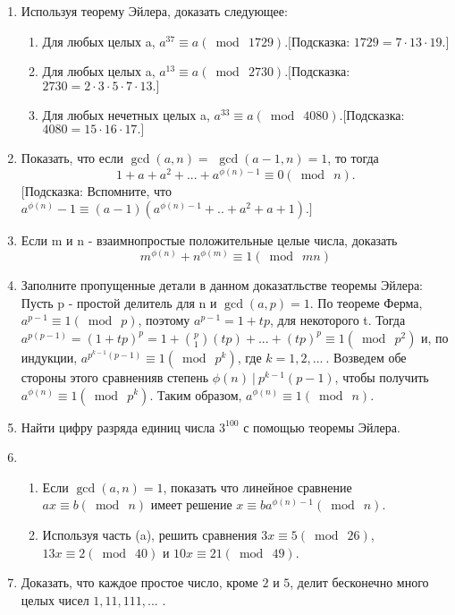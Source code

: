 \documentclass[11pt, leqno]{article}
\begin{document}
\begin{enumerate}
	\item Используя теорему Эйлера, доказать следующее:
		\begin{enumerate}
			\item Для любых целых a, $a^{37} \equiv a (\bmod\ 1729). [$Подсказка: $1729 = 7 \cdot 13 \cdot 19.]$
			\item Для любых целых a, $a^{13} \equiv a (\bmod\ 2730). [$Подсказка: $2730 = 2 \cdot 3 \cdot 5 \cdot 7 \cdot 13.]$
			\item Для любых нечетных целых a, $a^{33} \equiv a (\bmod\ 4080). [$Подсказка: $4080 = 15 \cdot 16 \cdot 17.]$
		\end{enumerate}
	\item Показать, что если $\gcd(a, n) =$ $\gcd(a-1, n) = 1$, то тогда
	\[1 + a + a^2 + ... + a^{\phi(n)-1}  \equiv 0 (\bmod\ n).\]
	$[$Подсказка: Вспомните, что $a^{\phi(n)} - 1 \equiv (a - 1)(a^{\phi(n) - 1} + .. + a^2 + a + 1). ]$
	\item Если m и n - взаимнопростые положительные целые числа, доказать
	\[m^{\phi(n)} + n^{\phi(m)} \equiv 1 (\bmod\ mn)\]
	\item Заполните пропущенные детали в данном доказатльстве теоремы Эйлера: Пусть p - простой делитель для n и $\gcd(a, p) = 1$. По теореме Ферма, $a^{p - 1} \equiv 1 (\bmod\ p)$, поэтому $a^{p - 1} = 1 + tp$, для некоторого t. Тогда $a^{p(p - 1)} = (1 + tp)^p = 1 + \binom{p}{1} (tp) + ... + (tp)^p \equiv 1 (\bmod\ p^2)$ и, по индукции, $a^{p^{k - 1}(p - 1)} \equiv 1 (\bmod\ p^k)$, где $k = 1, 2, ...\ .$ Возведем обе стороны этого сравненияв степень $\phi(n)\ |\ p^{k - 1}(p - 1)$, чтобы получить $a^{\phi(n)} \equiv 1 (\bmod\ p^k)$. Таким образом, $a^{\phi(n)} \equiv 1 (\bmod\ n)$.
	\item Найти цифру разряда единиц числа $3^{100}$ с помощью теоремы Эйлера.
	\item 	\begin{enumerate}
			\item Если $\gcd(a, n) = 1$, показать что линейное сравнение $ax \equiv b (\bmod\ n)$ имеет решение $x \equiv  ba^{\phi(n) - 1} (\bmod\ n)$.
			\item Используя часть (a), решить сравнения $3x \equiv 5 (\bmod\ 26)$, $13x \equiv 2 (\bmod\ 40)$ и $10x \equiv 21 (\bmod\ 49)$.
			\end{enumerate}
	\item Доказать, что каждое простое число, кроме $2$ и $5$, делит бесконечно много целых чисел $1, 11, 111, ...$ .
\end{enumerate}
\end{document}
